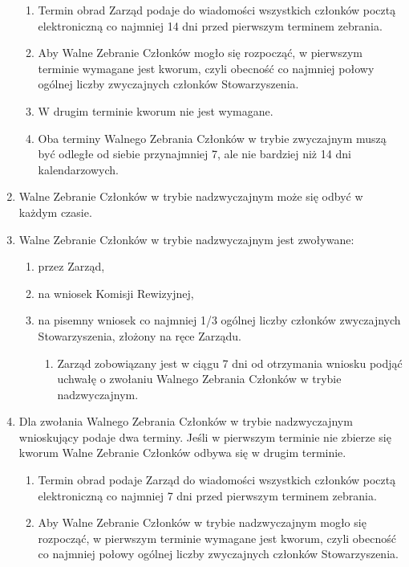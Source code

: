 \documentclass{article}
\begin{document}
\begin{enumerate}
      \begin{enumerate}
        \item Termin obrad Zarząd podaje do wiadomości wszystkich członków pocztą elektroniczną co najmniej 14 dni przed pierwszym terminem zebrania.
        \item Aby Walne Zebranie Członków mogło się rozpocząć, w pierwszym terminie wymagane jest kworum, czyli obecność co najmniej połowy ogólnej liczby zwyczajnych członków Stowarzyszenia.
        \item W drugim terminie kworum nie jest wymagane.
        \item Oba terminy Walnego Zebrania Członków w trybie zwyczajnym muszą być odległe od siebie przynajmniej 7, ale nie bardziej niż 14 dni kalendarzowych.
      \end{enumerate}
    \item Walne Zebranie Członków w trybie nadzwyczajnym może się odbyć w każdym czasie.
    \item Walne Zebranie Członków w trybie nadzwyczajnym jest zwoływane:
      \begin{enumerate}
        \item przez Zarząd,
        \item na wniosek Komisji Rewizyjnej,
        \item na pisemny wniosek co najmniej 1/3 ogólnej liczby członków zwyczajnych Stowarzyszenia, złożony na ręce Zarządu.
          \begin{enumerate}
            \item Zarząd zobowiązany jest w ciągu 7 dni od otrzymania wniosku podjąć uchwałę o zwołaniu Walnego Zebrania Członków w trybie nadzwyczajnym.
          \end{enumerate}
        \end{enumerate}
    \item Dla zwołania Walnego Zebrania Członków w trybie nadzwyczajnym wnioskujący podaje dwa terminy. Jeśli w pierwszym terminie nie zbierze się kworum Walne Zebranie Członków odbywa się w drugim terminie.
      \begin{enumerate}
        \item Termin obrad podaje Zarząd do wiadomości wszystkich członków pocztą elektroniczną co najmniej 7 dni przed pierwszym terminem zebrania.
        \item Aby Walne Zebranie Członków w trybie nadzwyczajnym mogło się rozpocząć, w pierwszym terminie wymagane jest kworum, czyli obecność co najmniej połowy ogólnej liczby zwyczajnych członków Stowarzyszenia.

\end{enumerate}
\end{enumerate}
\end{document}
